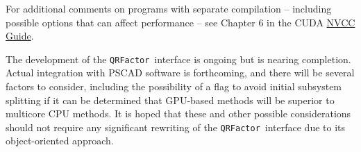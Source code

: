 \documentclass[11pt,letterpaper]{article}
\newcommand{\qrf}{\texttt{QRFactor}}
\begin{document}
For additional comments on programs with separate compilation -- including possible options that can affect performance -- see Chapter 6 in the CUDA \href{https://docs.nvidia.com/cuda/pdf/CUDA_Compiler_Driver_NVCC.pdf}{NVCC Guide}.

The development of the \qrf~interface is ongoing but is nearing completion. Actual integration with PSCAD software is forthcoming, and there will be several factors to consider, including the possibility of a flag to avoid initial subsystem splitting if it can be determined that GPU-based methods will be superior to multicore CPU methods. It is hoped that these and other possible considerations should not require any significant rewriting of the \qrf~interface due to its object-oriented approach. 

\end{document}
